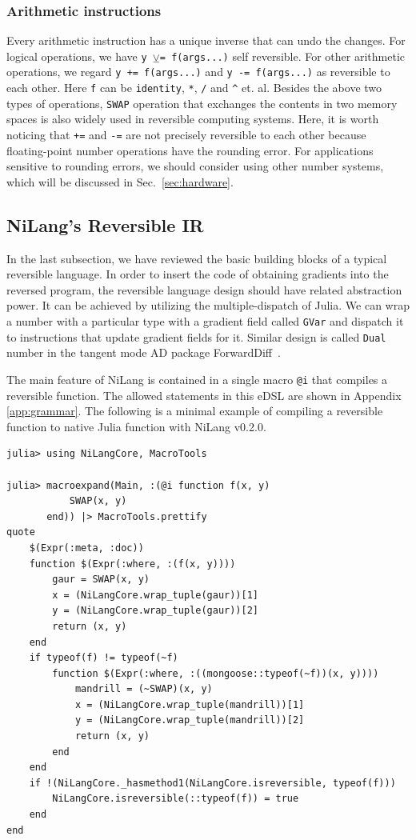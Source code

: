 \documentclass{article}
\newcommand{\<}{\langle}
\renewcommand{\>}{\rangle}
\newcommand{\Sec}[1]{Sec.~\ref{#1}}
\newcommand{\App}[1]{Appendix \ref{#1}}
\theoremstyle{definition}\newtheorem{definition}{\textit{Definition}}
\begin{document}
\subsubsection{Arithmetic instructions}
Every arithmetic instruction has a unique inverse that can undo the changes.
For logical operations, we have \texttt{y $\veebar$= f(args...)} self reversible.
For other arithmetic operations, we regard \texttt{y += f(args...)} and \texttt{y -= f(args...)} as reversible to each other. Here \texttt{f} can be \texttt{identity}, \texttt{*}, \texttt{/} and \texttt{\^} et. al.
Besides the above two types of operations, \texttt{SWAP} operation that exchanges the contents in two memory spaces is also widely used in reversible computing systems.
Here, it is worth noticing that \texttt{+=} and \texttt{-=} are not precisely reversible to each other because floating-point number operations have the rounding error. For applications sensitive to rounding errors, we should consider using other number systems, which will be discussed in \Sec{sec:hardware}.

\subsection{NiLang's Reversible IR}
In the last subsection, we have reviewed the basic building blocks of a typical reversible language. In order to insert the code of obtaining gradients into the reversed program, the reversible language design should have related abstraction power.
It can be achieved by utilizing the multiple-dispatch of Julia.
We can wrap a number with a particular type with a gradient field called \texttt{GVar} and dispatch it to instructions that update gradient fields for it.
Similar design is called \texttt{Dual} number in the tangent mode AD package ForwardDiff~\cite{Revels2016}.

The main feature of NiLang is contained in a single macro \texttt{@i} that compiles a reversible function.
The allowed statements in this eDSL are shown in \App{app:grammar}.
The following is a minimal example of compiling a reversible function to native Julia function with NiLang v0.2.0.

\begin{minipage}{.88\columnwidth}
\begin{lstlisting}
julia> using NiLangCore, MacroTools

julia> macroexpand(Main, :(@i function f(x, y)
           SWAP(x, y)
       end)) |> MacroTools.prettify
quote
    $(Expr(:meta, :doc))
    function $(Expr(:where, :(f(x, y))))
        gaur = SWAP(x, y)
        x = (NiLangCore.wrap_tuple(gaur))[1]
        y = (NiLangCore.wrap_tuple(gaur))[2]
        return (x, y)
    end
    if typeof(f) != typeof(~f)
        function $(Expr(:where, :((mongoose::typeof(~f))(x, y))))
            mandrill = (~SWAP)(x, y)
            x = (NiLangCore.wrap_tuple(mandrill))[1]
            y = (NiLangCore.wrap_tuple(mandrill))[2]
            return (x, y)
        end
    end
    if !(NiLangCore._hasmethod1(NiLangCore.isreversible, typeof(f)))
        NiLangCore.isreversible(::typeof(f)) = true
    end
end
\end{lstlisting}
\end{minipage}
\end{document}
